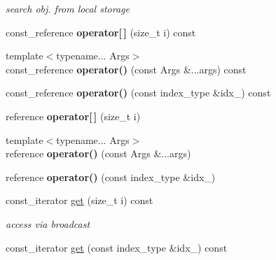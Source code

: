 \begin{DoxyCompactItemize}
\begin{DoxyCompactList}\small\item\em search obj. from local storage \item\end{DoxyCompactList}\item 
\hypertarget{classbtas_1_1_sp_tensor_a2e2ec1c9348c5d919356e7669ac01671}{
const\_\-reference {\bfseries operator\mbox{[}$\,$\mbox{]}} (size\_\-t i) const }
\label{classbtas_1_1_sp_tensor_a2e2ec1c9348c5d919356e7669ac01671}

\item 
\hypertarget{classbtas_1_1_sp_tensor_ac6be27c0fd67c256e20f7f115b6e6576}{
{\footnotesize template$<$typename... Args$>$ }\\const\_\-reference {\bfseries operator()} (const Args \&...args) const }
\label{classbtas_1_1_sp_tensor_ac6be27c0fd67c256e20f7f115b6e6576}

\item 
\hypertarget{classbtas_1_1_sp_tensor_a52d9295ff622157ada6e4b2a419f6a40}{
const\_\-reference {\bfseries operator()} (const index\_\-type \&idx\_\-) const }
\label{classbtas_1_1_sp_tensor_a52d9295ff622157ada6e4b2a419f6a40}

\item 
\hypertarget{classbtas_1_1_sp_tensor_adca019d2db52bb2162ecd6c1c5714e5c}{
reference {\bfseries operator\mbox{[}$\,$\mbox{]}} (size\_\-t i)}
\label{classbtas_1_1_sp_tensor_adca019d2db52bb2162ecd6c1c5714e5c}

\item 
\hypertarget{classbtas_1_1_sp_tensor_abf587a1409eeb7e343b6f3fca1c5d1fc}{
{\footnotesize template$<$typename... Args$>$ }\\reference {\bfseries operator()} (const Args \&...args)}
\label{classbtas_1_1_sp_tensor_abf587a1409eeb7e343b6f3fca1c5d1fc}

\item 
\hypertarget{classbtas_1_1_sp_tensor_a7ee34d896174a27c40842e81f8c5a45a}{
reference {\bfseries operator()} (const index\_\-type \&idx\_\-)}
\label{classbtas_1_1_sp_tensor_a7ee34d896174a27c40842e81f8c5a45a}

\item 
\hypertarget{classbtas_1_1_sp_tensor_a0340566716e22df9d625b6d5672c573a}{
const\_\-iterator \hyperlink{classbtas_1_1_sp_tensor_a0340566716e22df9d625b6d5672c573a}{get} (size\_\-t i) const }
\label{classbtas_1_1_sp_tensor_a0340566716e22df9d625b6d5672c573a}

\begin{DoxyCompactList}\small\item\em access via broadcast \item\end{DoxyCompactList}\item 
\hypertarget{classbtas_1_1_sp_tensor_aa85a65cfd835b4e0deb088eb0890c423}{
const\_\-iterator \hyperlink{classbtas_1_1_sp_tensor_aa85a65cfd835b4e0deb088eb0890c423}{get} (const index\_\-type \&idx\_\-) const }
\label{classbtas_1_1_sp_tensor_aa85a65cfd835b4e0deb088eb0890c423}


\end{DoxyCompactItemize}
